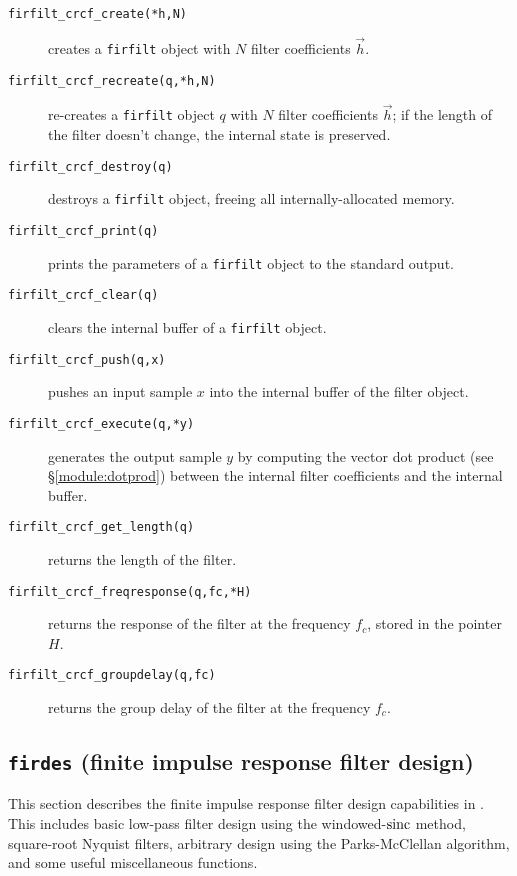 \begin{description}
\item[{\tt firfilt\_crcf\_create(*h,N)}]
    creates a {\tt firfilt} object with $N$ filter coefficients
    $\vec{h}$.
\item[{\tt firfilt\_crcf\_recreate(q,*h,N)}]
    re-creates a {\tt firfilt} object $q$ with $N$ filter coefficients
    $\vec{h}$;
    if the length of the filter doesn't change, the internal state is
    preserved.
\item[{\tt firfilt\_crcf\_destroy(q)}]
    destroys a {\tt firfilt} object, freeing all internally-allocated
    memory.
\item[{\tt firfilt\_crcf\_print(q)}]
    prints the parameters of a {\tt firfilt} object to the standard
    output.
\item[{\tt firfilt\_crcf\_clear(q)}]
    clears the internal buffer of a {\tt firfilt} object.
\item[{\tt firfilt\_crcf\_push(q,x)}]
    pushes an input sample $x$ into the internal buffer of the filter
    object.
\item[{\tt firfilt\_crcf\_execute(q,*y)}]
    generates the output sample $y$ by computing the vector dot product
    (see \S\ref{module:dotprod})
    between the internal filter coefficients and the internal buffer.
\item[{\tt firfilt\_crcf\_get\_length(q)}]
    returns the length of the filter.
\item[{\tt firfilt\_crcf\_freqresponse(q,fc,*H)}]
    returns the response of the filter at the frequency $f_c$, stored in
    the pointer $H$.
\item[{\tt firfilt\_crcf\_groupdelay(q,fc)}]
    returns the group delay of the filter at the frequency $f_c$.
\end{description}
%



% 
%

% 
%
\subsection{{\tt firdes} (finite impulse response filter design)}
\label{module:filter:firdes}
This section describes the finite impulse response filter design
capabilities in \liquid.
This includes basic low-pass filter design using the windowed-$\textup{sinc}$
method,
square-root Nyquist filters,
arbitrary design using the Parks-McClellan algorithm,
and some useful miscellaneous functions.

